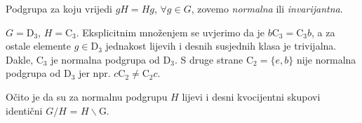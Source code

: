 \begin{definicija}
     

Podgrupa za koju vrijedi $gH=Hg$, $\forall g\in G$, zovemo
\emph{normalna} ili \emph{invarijantna}.
\label{tm:normalnapodgrupa}
\end{definicija}

\begin{primjer}[$\mathrm{D}_3$]
    $G=\mathrm{D}_3$, $H=\mathrm{C}_3$. Eksplicitnim množenjem se uvjerimo da
    je $b\mathrm{C}_3 = \mathrm{C}_3 b$, a za ostale elemente $g\in \mathrm{D}_3$ jednakost
    lijevih i desnih susjednih klasa je trivijalna.
    Dakle, $\mathrm{C}_3$  je normalna podgrupa od $\mathrm{D}_3$. S druge strane
    $\mathrm{C}_2 = \{e, b\}$ nije normalna podgrupa od $\mathrm{D}_3$
    jer npr. $c \mathrm{C}_2 \neq \mathrm{C}_2 c$.
\end{primjer}

Očito je da su za normalnu podgrupu $H$ lijevi i desni kvocijentni skupovi
identični  $G/H$ = $H\backslash$G.

